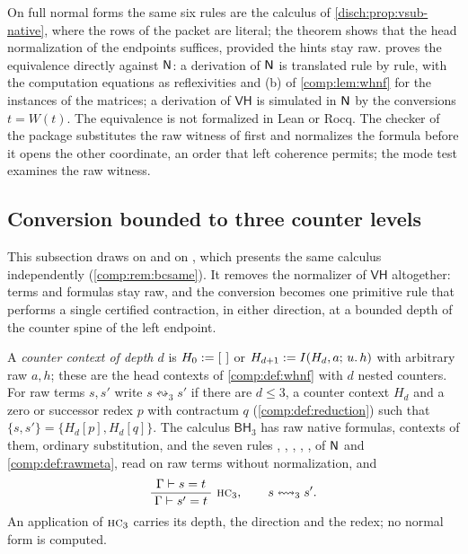 \begin{remark}
\label{comp:rem:vh}
On full normal forms the same six rules are the calculus of
\cref{disch:prop:vsub-native}, where the rows of the packet are literal; the
theorem shows that the head normalization of the endpoints suffices, provided
the hints stay raw.  proves the equivalence directly
against $\mathsf{N}$: a derivation of $\mathsf{N}$ is translated rule by rule, with the
computation equations as reflexivities and (b) of \cref{comp:lem:whnf} for
the instances of the matrices; a derivation of $\mathsf{VH}$ is simulated in
$\mathsf{N}$ by the conversions $t=W(t)$. The equivalence is not formalized in Lean
or Rocq. The checker of the package substitutes the raw witness of
 first and normalizes the formula before it opens the other
coordinate, an order that left coherence permits; the mode test examines the
raw witness.
\end{remark}

\subsection{Conversion bounded to three counter levels}
\label{comp:sec:bounded}

This subsection draws on  and on
, which presents the same calculus independently
(\cref{comp:rem:bcsame}). It removes the normalizer of
$\mathsf{VH}$ altogether: terms and formulas stay raw, and the conversion
becomes one primitive rule that performs a single certified contraction, in
either direction, at a bounded depth of the counter spine of the left
endpoint.

\begin{definition}
\label{comp:def:bh}
A \emph{counter context of depth $d$} is $H_0\mathrel{:=}[\ ]$ or
$H_{d+1}\mathrel{:=}I(H_d,a;\,u.\,h)$ with arbitrary raw $a,h$; these are the head
contexts of \cref{comp:def:whnf} with $d$ nested counters. For raw terms
$s,s'$ write $s\leftrightsquigarrow_3s'$ if there are $d\le3$, a counter
context $H_d$ and a zero or successor redex $p$ with contractum $q$
(\cref{comp:def:reduction}) such that $\{s,s'\}=\{H_d[p],H_d[q]\}$. The
calculus $\mathsf{BH}_3$ has raw native formulas, contexts of them, ordinary
substitution, and the seven rules , ,
, , ,  of $\mathsf{N}$ and
\cref{comp:def:rawmeta}, read on raw terms without normalization, and
\[
 \infrule{\Gamma\proves s=t}{\Gamma\proves s'=t}\ \rulename{HC}_3,
 \qquad s\leftrightsquigarrow_3s'.
\]
An application of $\rulename{HC}_3$ carries its depth, the direction and the
redex; no normal form is computed.
\end{definition}


